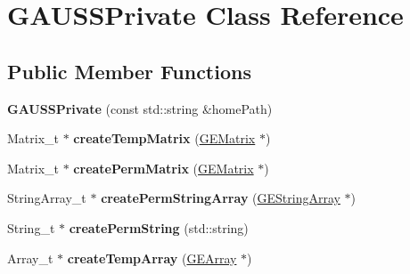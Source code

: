\hypertarget{class_g_a_u_s_s_private}{\section{G\-A\-U\-S\-S\-Private Class Reference}
\label{class_g_a_u_s_s_private}
}
\subsection*{Public Member Functions}
\begin{DoxyCompactItemize}
\item 
\hypertarget{class_g_a_u_s_s_private_a8c264b7a93edce217624ac9c04cd4a2e}{{\bfseries G\-A\-U\-S\-S\-Private} (const std\-::string \&home\-Path)}\label{class_g_a_u_s_s_private_a8c264b7a93edce217624ac9c04cd4a2e}

\item 
\hypertarget{class_g_a_u_s_s_private_aff4fb4ed797f509e455c67e90d06e1e3}{Matrix\-\_\-t $\ast$ {\bfseries create\-Temp\-Matrix} (\hyperlink{class_g_e_matrix}{G\-E\-Matrix} $\ast$)}\label{class_g_a_u_s_s_private_aff4fb4ed797f509e455c67e90d06e1e3}

\item 
\hypertarget{class_g_a_u_s_s_private_a9db7fd5a7f3d2f92c415d2200d372588}{Matrix\-\_\-t $\ast$ {\bfseries create\-Perm\-Matrix} (\hyperlink{class_g_e_matrix}{G\-E\-Matrix} $\ast$)}\label{class_g_a_u_s_s_private_a9db7fd5a7f3d2f92c415d2200d372588}

\item 
\hypertarget{class_g_a_u_s_s_private_a60855bd69a28e560a5e42cd4703b244f}{String\-Array\-\_\-t $\ast$ {\bfseries create\-Perm\-String\-Array} (\hyperlink{class_g_e_string_array}{G\-E\-String\-Array} $\ast$)}\label{class_g_a_u_s_s_private_a60855bd69a28e560a5e42cd4703b244f}

\item 
\hypertarget{class_g_a_u_s_s_private_a4649d797692bbd15a22da4c46d8fb6fb}{String\-\_\-t $\ast$ {\bfseries create\-Perm\-String} (std\-::string)}\label{class_g_a_u_s_s_private_a4649d797692bbd15a22da4c46d8fb6fb}

\item 
\hypertarget{class_g_a_u_s_s_private_a9fe3a2a8212180a888bbdbf2cdb02956}{Array\-\_\-t $\ast$ {\bfseries create\-Temp\-Array} (\hyperlink{class_g_e_array}{G\-E\-Array} $\ast$)}\label{class_g_a_u_s_s_private_a9fe3a2a8212180a888bbdbf2cdb02956}

\end{DoxyCompactItemize}

